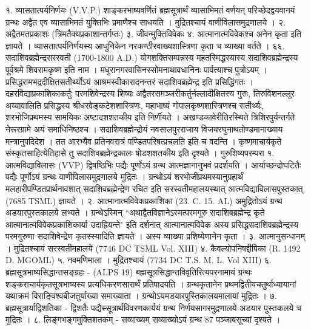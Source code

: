 १. व्यासतात्पर्यनिर्णयः (V.V.P.)
शाङ्करभाष्यवर्णितं ब्रह्मसूत्रार्थं व्यासाभिमतं वर्णयन् परिच्छेदद्वयवानयं ग्रन्थः अद्वैत एव व्यासाभिमतं युक्तिभिः प्रमाणैश्च साधयति । मुद्रितश्चायं वाणीविलासमुद्रणालये ।
२. अद्वैतमतप्रकाशः (त्रिमतैक्यप्रकाशान्तर्गप्तः)
३. जीवन्मुक्तिविवेकः 
४. आत्मानात्मविवेकश्च अनेन कृता इति ज्ञायते । व्यासतात्पर्यनिर्णयस्य आधुनिकेन नरकण्ठीरवाख्यशास्त्रिणा कृता च व्याख्या वर्तते ।
६६. सदाशिवब्रह्मेन्द्रसरस्वती (1700-1800 A.D.)
योगशक्तिसम्पन्नस्य महतस्मिद्धस्यास्य सदाशिवब्रह्मेन्द्रस्य पूर्वश्रमे शिवरामकृष्ण इति नाम । मधुरानगरवासिनस्सोमनाथावधानिनः पार्वत्याश्च पुत्रोऽयम् । प्रसिद्धरामभद्रदीक्षितसतीर्थ्योऽयं आश्रमस्वीकारादनन्तरं सदाशिवब्रह्मेन्द्र इति प्रसिद्धिंगतः । दहरविद्याप्रकाशिकाकर्तुः परमशिवेन्द्रस्य शिष्यः अद्वैतरसमञ्जरीकर्तुर्नल्लादीक्षितस्य गुरुः, तिरुविशनल्लूर अय्यावालिति प्रसिद्धस्य श्रीधरवेङ्कटेशशास्त्रिणः, महाभाष्यं गोपालकृष्णशास्त्रिणश्च सतीर्थ्यः, शरभोजिप्रथमस्य सामयिकः अष्टादशशतकीय इति निर्णीयते । अखण्डकावेरीतिरस्थिते त्रिशिरपुर्यन्तर्गते नेरूरग्रामे अयं समाधिनिष्ठश्च । सदाशिवब्रह्मेन्द्रोयं नवसालपुरराजाय विजयरघुनाथतोण्डमानाख्याय मन्त्रानुपदिदेश । तत आरभ्यैव प्रतिनवरात्रं पण्डितपरिषत्प्रचलति इति च वदन्ति ।
कृष्णमाचार्यकृते संस्कृतसाहित्येतिहासे तु सदाशिवब्रह्मेन्द्रकालः षोडशशतकीय इति दृश्यते ।
गुरुशिष्यपरम्परा
१. आत्मविद्याविलासः (VVP)
द्विषष्ठिभिः पद्यैः पूर्णोऽयं ग्रन्थ आत्मज्ञानानुभवं प्रदर्शयति । आर्याच्छन्दोघटितैः पद्यैः पूर्णोऽयं ग्रन्थः वाणीविलासमुद्रणालये मुद्रितः । ग्रन्थोऽयं शरभोजीप्रथमस्यानुग्रहार्थं मलहारीपण्डितप्रार्थनावशात् सदाशिवब्रह्मेन्द्रेण रचित इति सरस्वतीमहालयस्थात् आत्मविद्याविलासपुस्तकात् (7685 TSML) ज्ञायते ।
२. आत्मानात्मविवेकप्रकाशिका (23. C. 15. AL)
अमुद्रितोऽयं ग्रन्थ अडयारपुस्तकालये लभ्यते । ग्रन्थेऽस्मिन् ``अथाद्वैतविज्ञानेऽस्मत्परमगुरु सदाशिबब्रह्मेन्द्र कृते आत्मानात्मविवेकप्रकाशिकार्या उदाह्रियन्ते" इति दर्शनात् आत्मानात्मविवेक अस्य प्रसिद्धसदाशिवब्रह्मेन्द्रस्य परमगुरुणा सदाशिवेन्द्रेण कृतस्स्यादिति ज्ञायते । अस्य व्याख्या प्रशिष्येणानेन कृता ।
३. आत्मानुसन्धानम् । मुद्रितश्चायं सरस्वतीमहालये (7746 DC TSML Vol. XIII)
४. कैवल्योपनिषद्दीपिका (R. 1492 D. MGOML)
५. नवमणिमाला । मुद्रितश्चायं (7734 DC T.S. M. L. Vol XIII)
६. ब्रह्मसूत्रभाष्यसिद्धान्तसङ्ग्रहः - (ALPS 19)
बह्मसूत्रसिद्धान्तविवृतिरित्यपरनामायं ग्रन्थः शङ्कराचार्यकृतसूत्रभाष्यस्य प्रत्यधिकरणसारार्थं प्रतिपादयति । ग्रन्थकृतानेन प्रथमद्वितीयचतुर्थाध्यायानां यथाक्रमं विराङ्विश्वबीजतुर्याख्या समाख्याता । ग्रन्थोऽयमडयारपुस्तिकालयमालायां मुद्रितः ।
७. ब्रह्मसूत्रार्याद्विशतिका - द्विशतैः पद्यैस्सूत्रार्थविवरणकार्ययं ग्रन्थ निर्णयसागरमुद्रणालये अडयार पुस्तकलये च मुद्रितः ।
८. लिङ्गभङ्गमुक्तिशतकम् - सव्याख्यम् सव्याख्योऽयं ग्रन्थ 87 पञ्जाबसूच्यां दृश्यते ।
